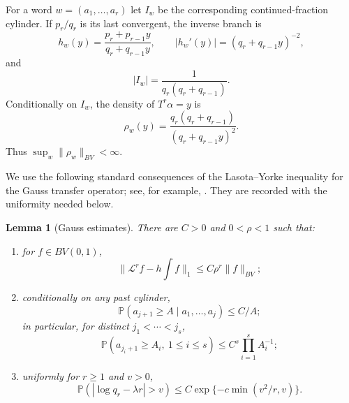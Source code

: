 \documentclass[11pt,a4paper]{amsart}
\newtheorem{lemma}[theorem]{Lemma}
\theoremstyle{definition}
\theoremstyle{remark}
\newcommand{\Pp}{\mathbb P}
\begin{document}
For a word $w=(a_1,\ldots,a_r)$ let $I_w$ be the corresponding
continued-fraction cylinder.  If $p_r/q_r$ is its last convergent, the inverse
branch is
\[
 h_w(y)=\frac{p_r+p_{r-1}y}{q_r+q_{r-1}y},
 \qquad
 |h_w'(y)|=(q_r+q_{r-1}y)^{-2},
\]
and
\begin{equation}\label{eq:cylinder-length}
 |I_w|=\frac1{q_r(q_r+q_{r-1})}.
\end{equation}
Conditionally on $I_w$, the density of $T^r\alpha=y$ is
\[
 \rho_w(y)=\frac{q_r(q_r+q_{r-1})}{(q_r+q_{r-1}y)^2}.
\]
Thus $\sup_w\|\rho_w\|_{BV}<\infty$.

We use the following standard consequences of the Lasota--Yorke inequality
for the Gauss transfer operator; see, for example, \cite{Baladi00}.  They are
recorded with the uniformity needed below.

\begin{lemma}[Gauss estimates]\label{lem:gauss-estimates}
There are $C>0$ and $0<\rho<1$ such that:
\begin{enumerate}
\item for $f\in BV(0,1)$,
\[
 \|\mathcal L^rf-h\!\int f\|_1\le C\rho^r\|f\|_{BV};
\]
\item conditionally on any past cylinder,
\[
 \Pp(a_{j+1}\ge A\mid a_1,\ldots,a_j)\le C/A;
\]
in particular, for distinct $j_1<\cdots<j_s$,
\begin{equation}\label{eq:multi-digit-tail}
 \Pp(a_{j_i+1}\ge A_i,\ 1\le i\le s)
 \le C^s\prod_{i=1}^s A_i^{-1};
\end{equation}
\item uniformly for $r\ge1$ and $v>0$,
\begin{equation}\label{eq:q-large-deviation}
 \Pp(|\log q_r-\lambda r|>v)
 \le C\exp\{-c\min(v^2/r,v)\}.
\end{equation}
\end{enumerate}
\end{lemma}
\end{document}
